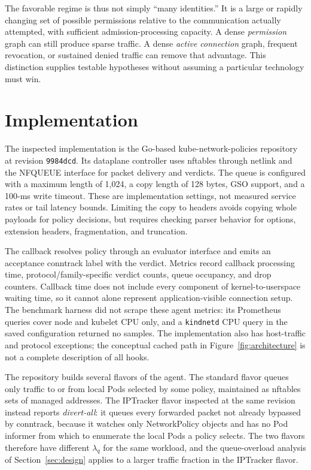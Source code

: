 \documentclass[letterpaper,twocolumn,10pt]{article}
\begin{document}
The favorable regime is thus not simply ``many identities.'' It is a
large or rapidly changing set of possible permissions relative to the
communication actually attempted, with sufficient admission-processing
capacity. A dense \emph{permission} graph can still produce sparse traffic.
A dense \emph{active connection} graph, frequent revocation, or sustained
denied traffic can remove that advantage. This distinction supplies
testable hypotheses without assuming a particular technology must win.

\section{Implementation}
\label{sec:implementation}
The inspected implementation is the Go-based kube-network-policies
repository at revision \texttt{9984dcd}. Its dataplane controller uses
nftables through netlink and the NFQUEUE interface for packet delivery
and verdicts. The queue is configured with a maximum length of 1,024,
a copy length of 128 bytes, GSO support, and a 100-ms write timeout.
These are implementation settings, not measured service rates or tail
latency bounds. Limiting the copy to headers avoids copying whole
payloads for policy decisions, but requires checking parser behavior
for options, extension headers, fragmentation, and truncation.

The callback resolves policy through an evaluator interface and emits
an acceptance conntrack label with the verdict. Metrics record callback
processing time, protocol/family-specific verdict counts, queue occupancy,
and drop counters. Callback time does not include every component of
kernel-to-userspace waiting time, so it cannot alone represent
application-visible connection setup. The benchmark harness did not
scrape these agent metrics: its Prometheus queries cover node and
kubelet CPU only, and a \texttt{kindnetd} CPU query in the saved
configuration returned no samples. The implementation also has
host-traffic and protocol exceptions; the conceptual cached path in
Figure~\ref{fig:architecture} is not a complete description of all hooks.

The repository builds several flavors of the agent. The standard flavor
queues only traffic to or from local Pods selected by some policy,
maintained as nftables sets of managed addresses. The IPTracker flavor
inspected at the same revision instead reports \emph{divert-all}: it
queues every forwarded packet not already bypassed by conntrack,
because it watches only NetworkPolicy objects and has no Pod informer
from which to enumerate the local Pods a policy selects. The two flavors
therefore have different $\lambda_q$ for the same workload, and the
queue-overload analysis of Section~\ref{sec:design} applies to a larger
traffic fraction in the IPTracker flavor.
\end{document}
